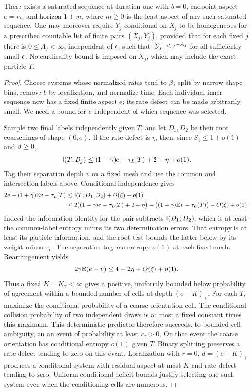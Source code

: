 \begin{proposition}
\label{prop:least-aspect}
There exists a saturated sequence at duration one with $b=0$, endpoint
aspect $e=m$, and horizon $1+m$, where $m\ge0$ is the least aspect of
any such saturated sequence.  One may moreover require $Y_j$ conditional on $X_j$ to be homogeneous
for a prescribed countable list of finite pairs $(X_j,Y_j)$, provided
that for each fixed $j$ there is $0\le A_j<\infty$, independent of $\epsilon$,
such that $|\mathcal Y_j|\le\epsilon^{-A_j}$ for all sufficiently small $\epsilon$.
No cardinality bound is imposed on $X_j$, which may include the exact
particle $T$.
\end{proposition}
\begin{proof}
Choose systems whose normalized rates tend to $\beta$, split by narrow
shape bins, remove $b$ by localization, and normalize time.  Each
individual inner sequence now has a fixed finite aspect $e$; its
rate defect can be made arbitrarily small.  We need a bound for $e$
independent of which sequence was selected.

Sample two final labels independently given $T$, and let $D_1,D_2$ be
their root coarsenings of shape $(0,e)$.  If the rate defect is $\eta$,
then, since $S_1\le1+o(1)$ and $\beta\ge0$,
\[
 \mathsf I(T;D_j)\le(1-\gamma)e-\tau_L(T)+2+\eta+o(1).
\]
Tag their separation depth $v$ on a fixed mesh and use the common and
intersection labels above.  Conditional independence gives
\begin{align*}
 2e-(1+\gamma)\mathbb E v-\tau_L(T)
 &\le\mathsf I(T;D_1,D_2)+O(\xi)+o(1)\\
 &\le2\big((1-\gamma)e-\tau_L(T)+2+\eta\big)
       -\big((1-\gamma)\mathbb E v-\tau_L(T)\big)
       +O(\xi)+o(1).
\end{align*}
Indeed the information identity for the pair subtracts
$\mathsf I(D_1;D_2)$, which is at least the common-label entropy minus its
two determination errors.  That entropy is at least its particle
information, and the root test bounds the latter below by its weight
minus $\tau_L$.  The separation tag has entropy $o(1)$ at each fixed
mesh.  Rearrangement yields
\[
 2\gamma\mathbb E(e-v)\le4+2\eta+O(\xi)+o(1).
\]
Thus a fixed $K=K_\gamma<\infty$ gives a positive, uniformly bounded
below probability of agreement within a bounded number of cells at
depth $(e-K)_+$.  For each $T$, maximize the conditional probability
of a coarse orientation cell.  The conditional collision probability
of two independent draws is at most a fixed constant times this
maximum.  This deterministic predictor therefore succeeds, to bounded
cell ambiguity, on an event of probability at least $c_\gamma>0$.
On that event the coarse orientation has conditional entropy $o(1)$
given $T$.  Binary splitting preserves a rate defect tending to zero
on this event.  Localization with $r=0$, $d=(e-K)_+$ produces a
conditional system with residual aspect at most $K$ and rate defect
tending to zero.  Uniform conditional deficit bounds justify selecting
one such system even when the conditioning cells are numerous.


\end{proof}
